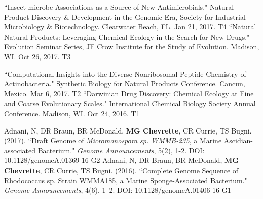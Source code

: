 
\begin{cvpubs}
  \cvpub
    {``Insect-microbe Associations as a Source of New Antimicrobials." Natural Product Discovery \& Development in the Genomic Era, Society for Industrial Microbiology \& Biotechnology. Clearwater Beach, FL. Jan 21, 2017.} %
    {T4} %
  \cvpub
    {``Natural Natural Products: Leveraging Chemical Ecology in the Search for New Drugs." Evolution Seminar Series, JF Crow Institute for the Study of Evolution. Madison, WI. Oct 26, 2017.} %
    {T3} %
    
\end{cvpubs}
\begin{cvpubs}

  \cvpub
    {``Computational Insights into the Diverse Nonribosomal Peptide Chemistry of Actinobacteria." Synthetic Biology for Natural Products Conference. Cancun, Mexico. Mar 6, 2017.} %
    {T2} %
  \cvpub
    {``Darwinian Drug Discovery: Chemical Ecology at Fine and Coarse Evolutionary Scales." International Chemical Biology Society Annual Conference. Madison, WI. Oct 24, 2016.} %
    {T1} %
\end{cvpubs}


\begin{cvpubs}
  \cvpub
    {Adnani, N, DR Braun, BR McDonald, \textbf{MG Chevrette}, CR Currie, TS Bugni. (2017). ``Draft Genome of \textit{Micromonospora sp. WMMB-235}, a Marine Ascidian-associated Bacterium." \textit{Genome Announcements}, 5(2), 1-2. DOI: 10.1128/genomeA.01369-16} %
    {G2} %
  \cvpub
  {Adnani, N, DR Braun, BR McDonald, \textbf{MG Chevrette}, CR Currie, TS Bugni. (2016). ``Complete Genome Sequence of Rhodococcus sp. Strain WMMA185, a Marine Sponge-Associated Bacterium." \textit{Genome Announcements}, 4(6), 1–2. DOI: 10.1128/genomeA.01406-16} %
    {G1} %
\end{cvpubs}

